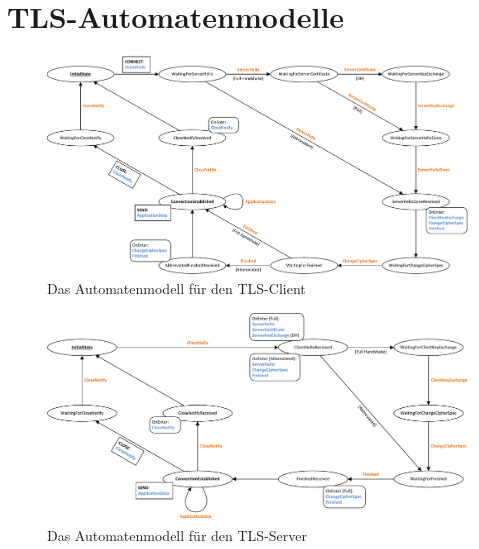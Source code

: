 \appendix

\chapter{TLS-Automatenmodelle}
\label{cha_tls_state_machines}

\begin{figure}[H]
	\centering
	\includegraphics[scale=0.75, angle = 90]{Diagrams/statemachines/client_state_machine.pdf} %
	\caption{Das Automatenmodell für den TLS-Client}
	\label{fig_tls_client_state_machine}
\end{figure}

\begin{figure}[H]
	\centering
	\includegraphics[scale=0.75, angle = 90]{Diagrams/statemachines/server_state_machine.pdf} %
	\caption{Das Automatenmodell für den TLS-Server}
	\label{fig_tls_server_state_machine}
\end{figure}